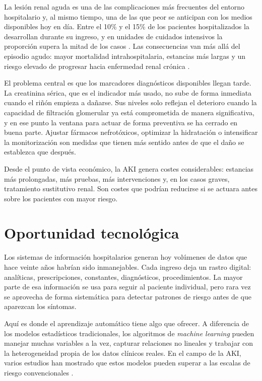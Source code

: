 \documentclass[12pt, a4paper, oneside]{report}
\begin{document}
La lesión renal aguda es una de las complicaciones más frecuentes del entorno hospitalario y, al mismo tiempo, una de las que peor se anticipan con los medios disponibles hoy en día. Entre el 10\% y el 15\% de los pacientes hospitalizados la desarrollan durante su ingreso, y en unidades de cuidados intensivos la proporción supera la mitad de los casos \parencite{hoste2018epidemiology, hoste2015akiepi}. Las consecuencias van más allá del episodio agudo: mayor mortalidad intrahospitalaria, estancias más largas y un riesgo elevado de progresar hacia enfermedad renal crónica \parencite{chawla2014akickd}.

El problema central es que los marcadores diagnósticos disponibles llegan tarde. La creatinina sérica, que es el indicador más usado, no sube de forma inmediata cuando el riñón empieza a dañarse. Sus niveles solo reflejan el deterioro cuando la capacidad de filtración glomerular ya está comprometida de manera significativa, y en ese punto la ventana para actuar de forma preventiva se ha cerrado en buena parte. Ajustar fármacos nefrotóxicos, optimizar la hidratación o intensificar la monitorización son medidas que tienen más sentido antes de que el daño se establezca que después.

Desde el punto de vista económico, la AKI genera costes considerables: estancias más prolongadas, más pruebas, más intervenciones y, en los casos graves, tratamiento sustitutivo renal. Son costes que podrían reducirse si se actuara antes sobre los pacientes con mayor riesgo.

\section{Oportunidad tecnológica}
\label{sec:oportunidad}

Los sistemas de información hospitalarios generan hoy volúmenes de datos que hace veinte años habrían sido inmanejables. Cada ingreso deja un rastro digital: analíticas, prescripciones, constantes, diagnósticos, procedimientos. La mayor parte de esa información se usa para seguir al paciente individual, pero rara vez se aprovecha de forma sistemática para detectar patrones de riesgo antes de que aparezcan los síntomas.

Aquí es donde el aprendizaje automático tiene algo que ofrecer. A diferencia de los modelos estadísticos tradicionales, los algoritmos de \textit{machine learning} pueden manejar muchas variables a la vez, capturar relaciones no lineales y trabajar con la heterogeneidad propia de los datos clínicos reales. En el campo de la AKI, varios estudios han mostrado que estos modelos pueden superar a las escalas de riesgo convencionales \parencite{tomasev2019nature, churpek2020validation, rank2022mlaki}.
\end{document}
